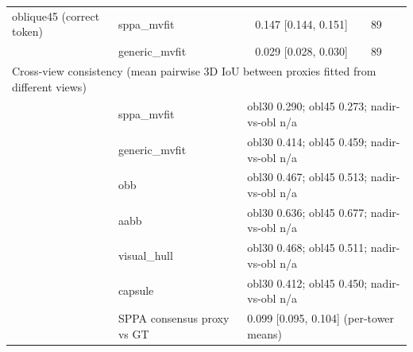 \begin{tabular}{llccc}
oblique45 (correct token) & sppa_mvfit & 0.147 [0.144, 0.151] & 89 &  \\
 & generic_mvfit & 0.029 [0.028, 0.030] & 89 &  \\
\midrule
\multicolumn{5}{l}{Cross-view consistency (mean pairwise 3D IoU between proxies fitted from different views)} \\
\midrule
 & sppa_mvfit & \multicolumn{3}{l}{obl30 0.290; obl45 0.273; nadir-vs-obl n/a} \\
 & generic_mvfit & \multicolumn{3}{l}{obl30 0.414; obl45 0.459; nadir-vs-obl n/a} \\
 & obb & \multicolumn{3}{l}{obl30 0.467; obl45 0.513; nadir-vs-obl n/a} \\
 & aabb & \multicolumn{3}{l}{obl30 0.636; obl45 0.677; nadir-vs-obl n/a} \\
 & visual_hull & \multicolumn{3}{l}{obl30 0.468; obl45 0.511; nadir-vs-obl n/a} \\
 & capsule & \multicolumn{3}{l}{obl30 0.412; obl45 0.450; nadir-vs-obl n/a} \\
 & SPPA consensus proxy vs GT & \multicolumn{3}{l}{0.099 [0.095, 0.104] (per-tower means)} \\
\bottomrule
\end{tabular}
